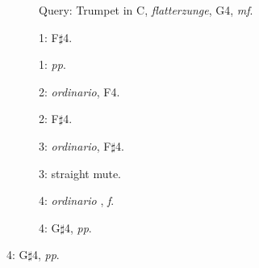 \begin{figure}
        \newcommand{\scalwidth}{28.0mm}
        \newcommand{\scalheight}{22.1mm}
        \newcommand{\arrowextra}{2mm}

        \begin{subfigure}{\linewidth}
                \centering
                \caption*{Query: Trumpet in C, \emph{flatterzunge}, G4, \emph{mf}.}
                \label{fig:TpC-flatt-G4-mf}
        \end{subfigure}%

        \begin{subfigure}{0.20\textwidth}
                \centering
                \caption*{1: F$\sharp$4.}
                \label{fig:TpC-flatt-Fsh4-mf-left}
        \end{subfigure}%
        \begin{subfigure}{0.20\textwidth}
                \centering
                \caption*{1: \emph{pp}.}
                \label{fig:TpC-flatt-G4-pp}
        \end{subfigure}%

        \begin{subfigure}{0.20\textwidth}
                \centering
                \caption*{2: \emph{ordinario}, F4.}
                \label{fig:TpC-ord-F4-mf}
        \end{subfigure}%
        \begin{subfigure}{0.20\textwidth}
                \centering
                \caption*{2: F$\sharp$4.}
                \label{fig:TpC-flatt-Fsh4-mf-right}
        \end{subfigure}%

        \begin{subfigure}{0.20\textwidth}
                \centering
                \caption*{3: \emph{ordinario}, F$\sharp$4.}
                \label{fig:TpC-ord-Fsh4-mf}
        \end{subfigure}%
        \begin{subfigure}{0.20\textwidth}
                \centering
                \caption*{3: straight mute.}
                \label{fig:TpC+S-flatt-G4-mf}
        \end{subfigure}%

        \begin{subfigure}{0.20\textwidth}
                \centering
                \caption*{4: \emph{ordinario}%
                , \emph{f}.}
                \label{fig:TpC-ord_flatt-F4-f}
        \end{subfigure}%
        \begin{subfigure}{0.20\textwidth}
                \centering
                \caption*{4: G$\sharp$4, \emph{pp}.}
                \label{fig:TpC-flatt-Gsh4-pp}
        \end{subfigure}%


\end{figure}

